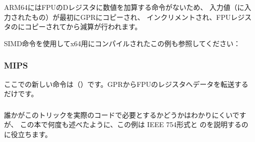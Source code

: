 ARM64にはFPUのDレジスタに数値を加算する命令がないため、
入力値（に入力されたもの）が最初に\ac{GPR}にコピーされ、
インクリメントされ、FPUレジスタのにコピーされてから減算が行われます。



SIMD命令を使用してx64用にコンパイルされたこの例も参照してください：

\subsubsection{MIPS}


ここでの新しい命令は（）です。\ac{GPR}からFPUのレジスタへデータを転送するだけです。



\subsubsection{\Conclusion}

誰かがこのトリックを実際のコードで必要とするかどうかはわかりにくいですが、
この本で何度も述べたように、この例は
IEEE 754形式と \CCpp のを説明するのに役立ちます。
